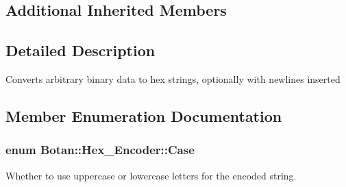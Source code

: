 \subsection*{Additional Inherited Members}


\subsection{Detailed Description}
Converts arbitrary binary data to hex strings, optionally with newlines inserted 

\subsection{Member Enumeration Documentation}
\hypertarget{classBotan_1_1Hex__Encoder_ac7dcfc2c536db2720587da1919b908c3}{
\subsubsection[{Case}]{\setlength{\rightskip}{0pt plus 5cm}enum {\bf Botan\-::\-Hex\-\_\-\-Encoder\-::\-Case}}}\label{classBotan_1_1Hex__Encoder_ac7dcfc2c536db2720587da1919b908c3}
Whether to use uppercase or lowercase letters for the encoded string. 

